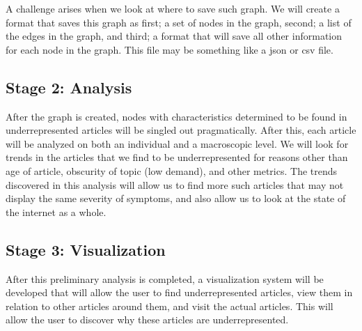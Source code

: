 \documentclass[fontsize=12pt]{article}
\begin{document}
\begin{multicols}{2}
    A challenge arises when we look at where to save such graph. We will create a format that saves this graph as first; a set of nodes in the graph, second; a list of the edges in the graph, and third; a format that will save all other information for each node in the graph. This file may be something like a json or csv file.
    
    \subsection{Stage 2: Analysis}
    After the graph is created, nodes with characteristics determined to be found in underrepresented articles will be singled out pragmatically. After this, each article will be analyzed on both an individual and a macroscopic level. We will look for trends in the articles that we find to be underrepresented for reasons other than age of article, obscurity of topic (low demand), and other metrics. The trends discovered in this analysis will allow us to find more such articles that may not display the same severity of symptoms, and also allow us to look at the state of the internet as a whole.
    
    \subsection{Stage 3: Visualization}
    After this preliminary analysis is completed, a visualization system will be developed that will allow the user to find underrepresented articles, view them in relation to other articles around them, and visit the actual articles. This will allow the user to discover why these articles are underrepresented.
    
    
    

\end{multicols}
\end{document}
